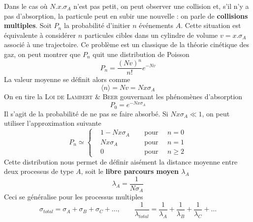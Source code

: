 Dans le cas où $N.x.\sigma_A$ n'est pas petit, on peut observer une collision et, s'il 
n'y a pas d'absorption, la particule peut en subir une nouvelle : on parle de \textbf{
collisions multiples}. Soit $P_n$ la probabilité d'initier $n$ événements $A$. Cette 
situation est équivalente à considérer $n$ particules cibles dans un cylindre de volume 
$v=x.\sigma_A$ associé à une trajectoire. Ce problème est un classique de la théorie 
cinétique des gaz, on peut montrer que $P_n$ quit une distribution de Poisson
\begin{equation}
P_n=\frac{(Nv)^n}{n!}e^{-Nv}
\end{equation}
La valeur moyenne se définit alors comme
\begin{equation}
\langle n \rangle=Nv=Nx\sigma_A
\end{equation}
On en tire la \textsc{Loi de Lambert \& Beer} gouvernant les phénomènes d'absorption
\begin{equation}
P_0=e^{-Nx\sigma_A}
\end{equation}
Il s'agit de la probabilité de ne pas se faire absorbé. Si $Nx\sigma_A\ll 1$, on peut 
utiliser l'approximation suivante
\begin{equation}
P_n\simeq\left\{
\begin{aligned}
   &1-Nx\sigma_A& {\mbox{~~~~pour~~~~}} n=0\\
   &Nx\sigma_A& {\mbox{~~~~pour~~~~}} n=1\\
   &0&{\mbox{~~~~pour~~~~}} n\ge 2
\end{aligned} 
\right.
\end{equation}
Cette distribution nous permet de définir aisément la distance moyenne entre deux 
processus de type $A$, soit le \textbf{libre parcours moyen $\lambda_A$}
\begin{equation}
\lambda_A=\frac{1}{N\sigma_A}
\end{equation}
Ceci se généralise pour les processus multiples
\begin{equation}
\sigma_{total}=\sigma_A+\sigma_B+\sigma_C+\dots,\qquad \frac{1}{\lambda_{total}}=\frac{1}{\lambda_{A}}+\frac{1}{\lambda_{B}}+\frac{1}{\lambda_{C}}+\dots
\end{equation}


